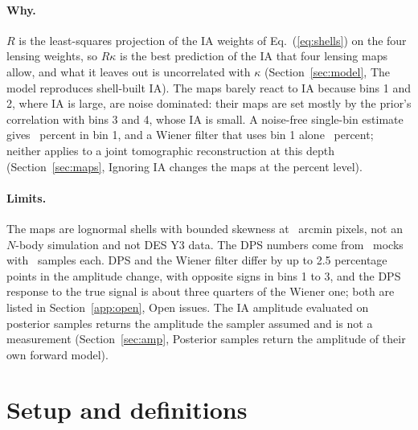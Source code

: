 \documentclass[11pt]{article}
\begin{document}
\paragraph{Why.}
$R$ is the least-squares projection of the IA weights of Eq.~(\ref{eq:shells}) on the four
lensing weights, so $R\kappa$ is the best prediction of the IA that four lensing maps allow,
and what it leaves out is uncorrelated with $\kappa$ (Section~\ref{sec:model}, The model
reproduces shell-built IA). The maps barely react to IA because bins 1 and 2, where IA is
large, are noise dominated: their maps are set mostly by the prior's correlation with bins 3
and 4, whose IA is small. A noise-free single-bin estimate gives \KSBiasOne\ percent in bin 1,
and a Wiener filter that uses bin 1 alone \WFSingleBiasOne\ percent; neither applies to a
joint tomographic reconstruction at this depth (Section~\ref{sec:maps}, Ignoring IA changes
the maps at the percent level).

\paragraph{Limits.}
The maps are lognormal shells with bounded skewness at \PixArcmin\ arcmin pixels, not an
$N$-body simulation and not DES Y3 data. The DPS numbers come from \NMocks\ mocks with
\NSamples\ samples each. DPS and the Wiener filter differ by up to 2.5 percentage points in the
amplitude change, with opposite signs in bins 1 to 3, and the DPS response to the true signal
is about three quarters of the Wiener one; both are listed in Section~\ref{app:open}, Open
issues. The IA amplitude evaluated on posterior samples returns the amplitude the sampler
assumed and is not a measurement (Section~\ref{sec:amp}, Posterior samples return the
amplitude of their own forward model).

\section{Setup and definitions}
\label{sec:setup}
\end{document}
